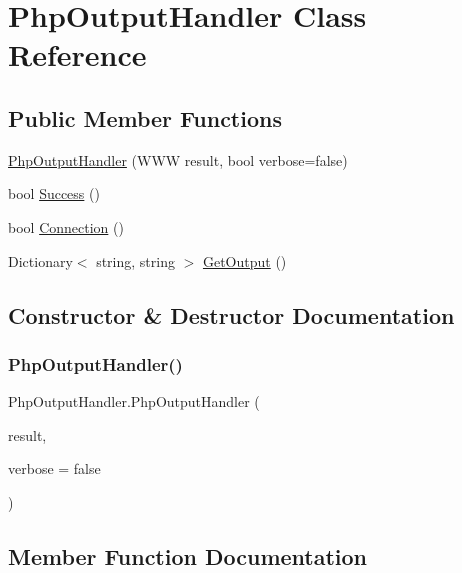 \hypertarget{classPhpOutputHandler}{}\section{Php\+Output\+Handler Class Reference}
\label{classPhpOutputHandler}
\subsection*{Public Member Functions}
\begin{DoxyCompactItemize}
\item 
\hyperlink{classPhpOutputHandler_a38a53815323031348ce5d15e0d715744}{Php\+Output\+Handler} (W\+WW result, bool verbose=false)
\item 
bool \hyperlink{classPhpOutputHandler_a4dc68556b5bc70042ce58328df9d7d98}{Success} ()
\item 
bool \hyperlink{classPhpOutputHandler_a9b04fd924fb62ad91b2da9887d917cbe}{Connection} ()
\item 
Dictionary$<$ string, string $>$ \hyperlink{classPhpOutputHandler_a0f74d89c9ae20505c5c2db462e477308}{Get\+Output} ()
\end{DoxyCompactItemize}


\subsection{Constructor \& Destructor Documentation}
\mbox{\label{classPhpOutputHandler_a38a53815323031348ce5d15e0d715744}} 
\subsubsection{\texorpdfstring{Php\+Output\+Handler()}{PhpOutputHandler()}}
{\footnotesize\ttfamily Php\+Output\+Handler.\+Php\+Output\+Handler (\begin{DoxyParamCaption}\item[{W\+WW}]{result,  }\item[{bool}]{verbose = {\ttfamily false} }\end{DoxyParamCaption})\hspace{0.3cm}{\ttfamily [inline]}}



\subsection{Member Function Documentation}
\mbox{\label{classPhpOutputHandler_a9b04fd924fb62ad91b2da9887d917cbe}} 
